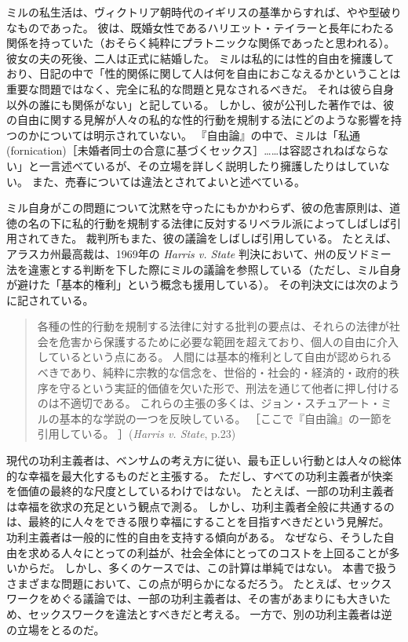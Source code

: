 \documentclass[paper=a4,book,openany]{jlreq} \usepackage{mystyle}
\begin{document}
ミルの私生活は、ヴィクトリア朝時代のイギリスの基準からすれば、やや型破りなものであった。
彼は、既婚女性であるハリエット・テイラーと長年にわたる関係を持っていた（おそらく純粋にプラトニックな関係であったと思われる）。
彼女の夫の死後、二人は正式に結婚した。
ミルは私的には性的自由を擁護しており、日記の中で「性的関係に関して人は何を自由におこなえるかということは重要な問題ではなく、完全に私的な問題と見なされるべきだ。
それは彼ら自身以外の誰にも関係がない」と記している\citep[p.664]{mill88:diary}。
しかし、彼が公刊した著作では、彼の自由に関する見解が人々の私的な性的行動を規制する法にどのような影響を持つのかについては明示されていない。
『自由論』の中で、ミルは「私通(fornication)［未婚者同士の合意に基づくセックス］……は容認されねばならない」と一言述べているが、その立場を詳しく説明したり擁護したりはしていない。
また、売春については違法とされてよいと述べている\citep[p.96]{mill15:_liber_utilit_other_essay}。

ミル自身がこの問題について沈黙を守ったにもかかわらず、彼の危害原則は、道徳の名の下に私的行動を規制する法律に反対するリベラル派によってしばしば引用されてきた。
裁判所もまた、彼の議論をしばしば引用している。
たとえば、アラスカ州最高裁は、1969年の \emph{Harris v. State} 判決において、州の反ソドミー法を違憲とする判断を下した際にミルの議論を参照している（ただし、ミル自身が避けた「基本的権利」という概念も援用している）。
その判決文には次のように記されている。

\begin{quote}
各種の性的行動を規制する法律に対する批判の要点は、それらの法律が社会を危害から保護するために必要な範囲を超えており、個人の自由に介入しているという点にある。
人間には基本的権利として自由が認められるべきであり、純粋に宗教的な信念を、世俗的・社会的・経済的・政府的秩序を守るという実証的価値を欠いた形で、刑法を通じて他者に押し付けるのは不適切である。
これらの主張の多くは、ジョン・スチュアート・ミルの基本的な学説の一つを反映している。
［ここで『自由論』の一節を引用している。
］(\emph{Harris v. State}, p.23)

\end{quote}

現代の功利主義者は、ベンサムの考え方に従い、最も正しい行動とは人々の総体的な幸福を最大化するものだと主張する。
ただし、すべての功利主義者が快楽を価値の最終的な尺度としているわけではない。
たとえば、一部の功利主義者は幸福を欲求の充足という観点で測る。
しかし、功利主義者全般に共通するのは、最終的に人々をできる限り幸福にすることを目指すべきだという見解だ。
功利主義者は一般的に性的自由を支持する傾向がある。
なぜなら、そうした自由を求める人々にとっての利益が、社会全体にとってのコストを上回ることが多いからだ。
しかし、多くのケースでは、この計算は単純ではない。
本書で扱うさまざまな問題において、この点が明らかになるだろう。
たとえば、セックスワークをめぐる議論では、一部の功利主義者は、その害があまりにも大きいため、セックスワークを違法とすべきだと考える。
一方で、別の功利主義者は逆の立場をとるのだ。
\end{document}

